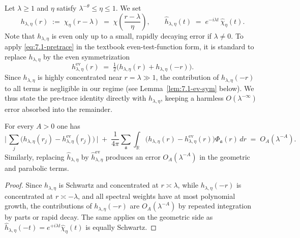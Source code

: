 Let $\lambda\ge 1$ and $\eta$ satisfy $\lambda^{-\theta}\le \eta\le 1$. We set
\[
  h_{\lambda,\eta}(r) \;:=\; \chi_\eta(r-\lambda) \;=\; \chi\!\left(\frac{r-\lambda}{\eta}\right),
  \qquad
  \widehat{h}_{\lambda,\eta}(t) \;=\; e^{-i \lambda t}\, \widehat{\chi}_\eta(t).
\]
Note that $h_{\lambda,\eta}$ is even only up to a small, rapidly decaying error if $\lambda\ne 0$. To apply \eqref{eq:7.1-pretrace} in the textbook even-test-function form, it is standard to replace $h_{\lambda,\eta}$ by the even symmetrization
\[
  h^{\mathrm{ev}}_{\lambda,\eta}(r)\;=\;\tfrac12\big(h_{\lambda,\eta}(r)+h_{\lambda,\eta}(-r)\big).
\]
Since $h_{\lambda,\eta}$ is highly concentrated near $r=\lambda\gg 1$, the contribution of $h_{\lambda,\eta}(-r)$ to all terms is negligible in our regime (see Lemma~\ref{lem:7.1-ev-sym} below). We thus state the pre-trace identity directly with $h_{\lambda,\eta}$, keeping a harmless $O(\lambda^{-\infty})$ error absorbed into the remainder.

\begin{lemma}\label{lem:7.1-ev-sym}
For every $A>0$ one has
\[
  \Big|\, \sum_{j}\!\big(h_{\lambda,\eta}(r_j)-h^{\mathrm{ev}}_{\lambda,\eta}(r_j)\big)\,\Big|
  \;+\; \frac{1}{4\pi}\sum_{\mathfrak{a}}\!
         \int_{\mathbb{R}}\!\big(h_{\lambda,\eta}(r)-h^{\mathrm{ev}}_{\lambda,\eta}(r)\big)
         \Phi_{\mathfrak{a}}(r)\, dr
  \;=\; O_A(\lambda^{-A}).
\]
Similarly, replacing $\widehat{h}_{\lambda,\eta}$ by $\widehat{h}^{\mathrm{ev}}_{\lambda,\eta}$ produces an error $O_A(\lambda^{-A})$ in the geometric and parabolic terms.
\end{lemma}

\begin{proof}
Since $h_{\lambda,\eta}$ is Schwartz and concentrated at $r\asymp \lambda$, while $h_{\lambda,\eta}(-r)$ is concentrated at $r\asymp -\lambda$, and all spectral weights have at most polynomial growth, the contributions of $h_{\lambda,\eta}(-r)$ are $O_A(\lambda^{-A})$ by repeated integration by parts or rapid decay. The same applies on the geometric side as $\widehat{h}_{\lambda,\eta}(-t)=e^{+i\lambda t}\widehat{\chi}_\eta(t)$ is equally Schwartz.
\end{proof}

